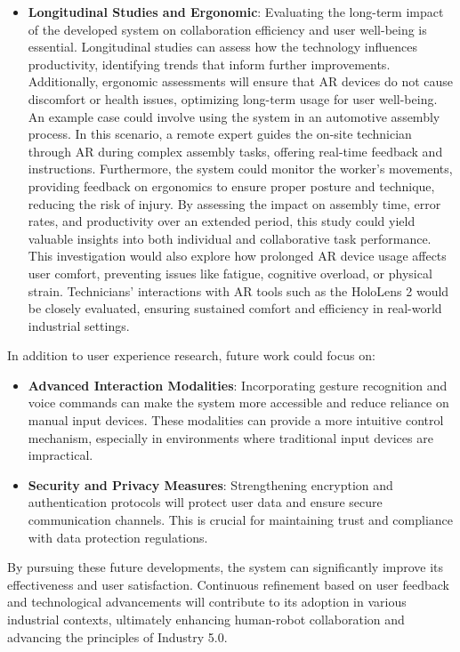 \begin{itemize}
    \item \textbf{Longitudinal Studies and Ergonomic}: Evaluating the long-term impact of the developed system on collaboration efficiency and user well-being is essential. Longitudinal studies can assess how the technology influences productivity, identifying trends that inform further improvements. Additionally, ergonomic assessments will ensure that \ac{AR} devices do not cause discomfort or health issues, optimizing long-term usage for user well-being. 
    An example case could involve using the system in an automotive assembly process. In this scenario, a remote expert guides the on-site technician through \ac{AR} during complex assembly tasks, offering real-time feedback and instructions. Furthermore, the system could monitor the worker’s movements, providing feedback on ergonomics to ensure proper posture and technique, reducing the risk of injury.
    By assessing the impact on assembly time, error rates, and productivity over an extended period, this study could yield valuable insights into both individual and collaborative task performance. This investigation would also explore how prolonged \ac{AR} device usage affects user comfort, preventing issues like fatigue, cognitive overload, or physical strain. Technicians’ interactions with \ac{AR} tools such as the HoloLens 2 would be closely evaluated, ensuring sustained comfort and efficiency in real-world industrial settings.
\end{itemize}

In addition to user experience research, future work could focus on:

\begin{itemize} 

    \item \textbf{Advanced Interaction Modalities}: Incorporating gesture recognition and voice commands can make the system more accessible and reduce reliance on manual input devices. These modalities can provide a more intuitive control mechanism, especially in environments where traditional input devices are impractical.
    
    \item \textbf{Security and Privacy Measures}: Strengthening encryption and authentication protocols will protect user data and ensure secure communication channels. This is crucial for maintaining trust and compliance with data protection regulations.
\end{itemize}

By pursuing these future developments, the system can significantly improve its effectiveness and user satisfaction. Continuous refinement based on user feedback and technological advancements will contribute to its adoption in various industrial contexts, ultimately enhancing human-robot collaboration and advancing the principles of Industry 5.0.

